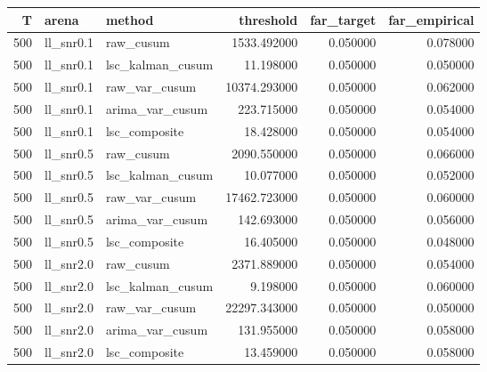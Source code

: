 \begin{tabular}{rllrrr}
\toprule
T & arena & method & threshold & far_target & far_empirical \\
\midrule
500 & ll_snr0.1 & raw_cusum & 1533.492000 & 0.050000 & 0.078000 \\
500 & ll_snr0.1 & lsc_kalman_cusum & 11.198000 & 0.050000 & 0.050000 \\
500 & ll_snr0.1 & raw_var_cusum & 10374.293000 & 0.050000 & 0.062000 \\
500 & ll_snr0.1 & arima_var_cusum & 223.715000 & 0.050000 & 0.054000 \\
500 & ll_snr0.1 & lsc_composite & 18.428000 & 0.050000 & 0.054000 \\
500 & ll_snr0.5 & raw_cusum & 2090.550000 & 0.050000 & 0.066000 \\
500 & ll_snr0.5 & lsc_kalman_cusum & 10.077000 & 0.050000 & 0.052000 \\
500 & ll_snr0.5 & raw_var_cusum & 17462.723000 & 0.050000 & 0.060000 \\
500 & ll_snr0.5 & arima_var_cusum & 142.693000 & 0.050000 & 0.056000 \\
500 & ll_snr0.5 & lsc_composite & 16.405000 & 0.050000 & 0.048000 \\
500 & ll_snr2.0 & raw_cusum & 2371.889000 & 0.050000 & 0.054000 \\
500 & ll_snr2.0 & lsc_kalman_cusum & 9.198000 & 0.050000 & 0.060000 \\
500 & ll_snr2.0 & raw_var_cusum & 22297.343000 & 0.050000 & 0.050000 \\
500 & ll_snr2.0 & arima_var_cusum & 131.955000 & 0.050000 & 0.058000 \\
500 & ll_snr2.0 & lsc_composite & 13.459000 & 0.050000 & 0.058000 \\
\bottomrule
\end{tabular}
